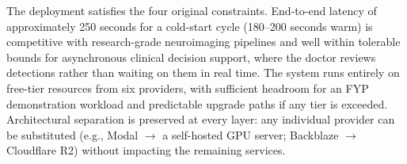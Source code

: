 \documentclass[11pt, a4paper]{article}
\begin{document}
The deployment satisfies the four original constraints. End-to-end latency of approximately 250 seconds for a cold-start cycle (180--200 seconds warm) is competitive with research-grade neuroimaging pipelines and well within tolerable bounds for asynchronous clinical decision support, where the doctor reviews detections rather than waiting on them in real time. The system runs entirely on free-tier resources from six providers, with sufficient headroom for an FYP demonstration workload and predictable upgrade paths if any tier is exceeded. Architectural separation is preserved at every layer: any individual provider can be substituted (e.g., Modal $\rightarrow$ a self-hosted GPU server; Backblaze $\rightarrow$ Cloudflare R2) without impacting the remaining services.
\end{document}
